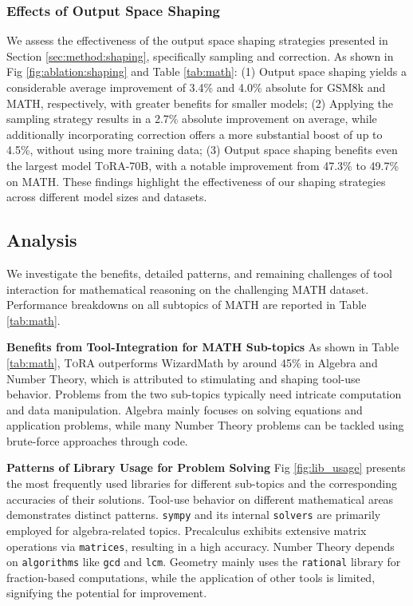 \subsubsection{Effects of Output Space Shaping}

We assess the effectiveness of the output space shaping strategies presented in Section \ref{sec:method:shaping}, specifically sampling and correction. As shown in Fig \ref{fig:ablation:shaping} and Table \ref{tab:math}:
(1) Output space shaping yields a considerable average improvement of 3.4\% and 4.0\% absolute for GSM8k and MATH, respectively, with greater benefits for smaller models; (2) Applying the sampling strategy results in a 2.7\% absolute improvement on average, while additionally incorporating correction offers a more substantial boost of up to 4.5\%, without using more training data; (3) Output space shaping benefits even the largest model \textsc{ToRA}-70B, with a notable improvement from 47.3\% to 49.7\% on MATH. These findings highlight the effectiveness of our shaping strategies across different model sizes and datasets.

\subsection{Analysis}

We investigate the benefits, detailed patterns, and remaining challenges of tool interaction for mathematical reasoning on the challenging MATH dataset. Performance breakdowns on all subtopics of MATH are reported in Table \ref{tab:math}.

\textbf{Benefits from Tool-Integration for MATH Sub-topics} As shown in Table \ref{tab:math}, \textsc{ToRA} outperforms WizardMath by around 45\% in Algebra and Number Theory, which is attributed to stimulating and shaping tool-use behavior. Problems from the two sub-topics typically need intricate computation and data manipulation. Algebra mainly focuses on solving equations and application problems, while many Number Theory problems can be tackled using brute-force approaches through code.

\textbf{Patterns of Library Usage for Problem Solving} Fig \ref{fig:lib_usage} presents the most frequently used libraries for different sub-topics and the corresponding accuracies of their solutions. Tool-use behavior on different mathematical areas demonstrates distinct patterns.
\texttt{sympy} and its internal \texttt{solvers} are primarily employed for algebra-related topics. Precalculus exhibits extensive matrix operations via \texttt{matrices}, resulting in a high accuracy. Number Theory depends on \texttt{algorithms} like \texttt{gcd} and \texttt{lcm}.
Geometry mainly uses the \texttt{rational} library for fraction-based computations, while the application of other tools is limited, signifying the potential for improvement.

